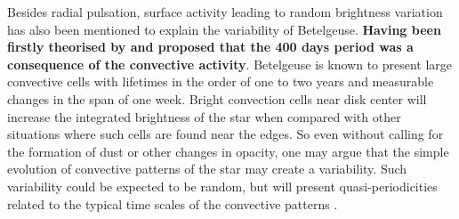 \documentclass{aa}
\begin{document}
Besides radial pulsation, surface activity leading to random brightness variation has also been mentioned to explain the variability of Betelgeuse. 
\textbf{Having been firstly theorised by \cite{schwarzschild_scale_1975} and \cite{gray_mass_2008} 
proposed that the 400 days period was a consequence of the convective activity}. Betelgeuse is known to present large convective cells with lifetimes in the order of one to two years \citep{lopez_ariste_convective_2018} and measurable changes 
in the span of one week. Bright convection cells near disk center will increase the integrated brightness of the star when 
compared with other situations where such cells are found near the edges. So even without calling for the formation of 
dust or other changes in opacity, one may argue that the simple evolution of convective patterns of the star may create a variability. Such 
variability could be expected to be random, but will present quasi-periodicities related to the typical time scales of the 
convective patterns \citep{gray_mass_2008}. \\

\end{document}
